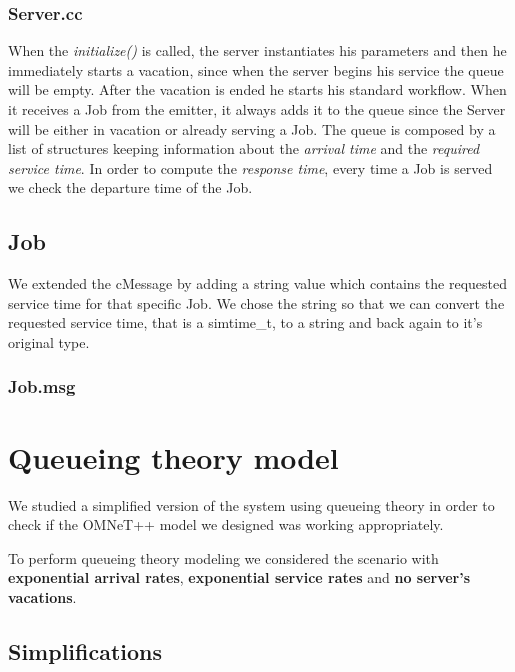 \documentclass{article}
\begin{document}
        \subsubsection{Server.cc}
        When the \textit{initialize()} is called, the server instantiates his parameters and then he immediately starts a vacation, since when the server begins his service the queue will be empty. After the vacation is ended he starts his standard workflow. When it receives a Job from the emitter, it always adds it to the queue since the Server will be either in vacation or already serving a Job. The queue is composed by a list of structures keeping information about the \textit{arrival time} and the \textit{required service time}. 
        In order to compute the \textit{response time}, every time a Job is served we check the departure time of the Job.
        
        
    \subsection{Job}
    We extended the cMessage by adding a string value which contains the requested service time for that specific Job. We chose the string so that we can convert the requested service time, that is a simtime\_t, to a string and back again to it's original type.
        \subsubsection{Job.msg}
        
        
\newpage

\section{Queueing theory model}

    We studied a simplified version of the system using queueing theory in order to check if the OMNeT++ model we designed was working appropriately.
    
    To perform queueing theory modeling we considered the scenario with \textbf{exponential arrival rates}, \textbf{exponential service rates} and \textbf{no server's vacations}.
    
    \subsection{Simplifications}
    
\end{document}
